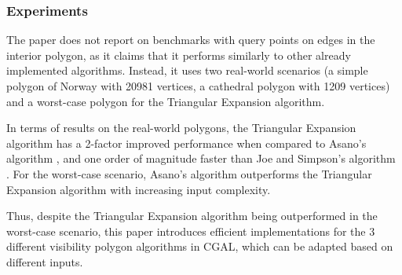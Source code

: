 \subsubsection{Experiments}
The paper does not report on benchmarks with query points on edges in the interior polygon, as it claims that it performs similarly to other already implemented algorithms. Instead, it uses two real-world scenarios (a simple polygon of Norway with 20981 vertices, a cathedral polygon with 1209 vertices) and a worst-case polygon for the Triangular Expansion algorithm.

In terms of results on the real-world polygons, the Triangular Expansion algorithm has a 2-factor improved performance when compared to Asano's algorithm \cite{asano1985efficient}, and one order of magnitude faster than Joe and Simpson's algorithm \cite{joe1987corrections}. For the worst-case scenario, Asano's algorithm \cite{asano1985efficient} outperforms the Triangular Expansion algorithm with increasing input complexity.

Thus, despite the Triangular Expansion algorithm being outperformed in the worst-case scenario, this paper introduces efficient implementations for the 3 different visibility polygon algorithms in CGAL, which can be adapted based on different inputs. 
